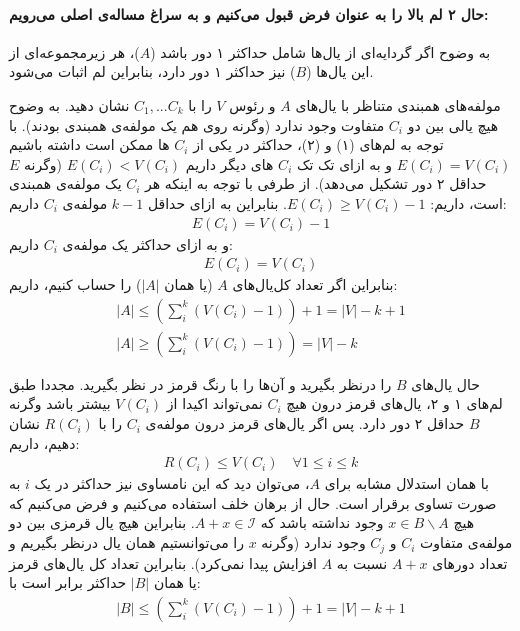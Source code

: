 \documentclass[a4paper,12pt]{article}
\begin{document}
\paragraph{حال ۲ لم بالا را به عنوان فرض قبول می‌کنیم و به سراغ مساله‌ی اصلی می‌رویم:}

\proof{}
به وضوح اگر گردایه‌ای از یال‌ها شامل حداکثر ۱ دور باشد ($A$)، هر زیرمجموعه‌ای از این یال‌ها ($B$) نیز حداکثر ۱ دور دارد، بنابراین لم اثبات می‌شود.


\proof{}
مولفه‌های همبندی متناظر با یال‌های $A$ و رئوس $V$ را با
$C_1, ... C_k$
نشان دهید. به وضوح هیچ یالی بین دو $C_i$ متفاوت وجود ندارد (وگرنه روی هم یک مولفه‌ی همبندی بودند). با توجه به لم‌های (۱) و (۲)، حداکثر در یکی از $C_i$ ها ممکن است داشته باشیم
$E(C_i) = V(C_i)$
و به ازای تک تک $C_i$ های دیگر داریم
$E(C_i) < V(C_i)$
(وگرنه $E$ حداقل ۲ دور تشکیل می‌دهد). از طرفی با توجه به اینکه هر $C_i$ یک مولفه‌‌ی همبندی است، داریم:
$E(C_i) \geq V(C_i) - 1$.
بنابراین به ازای حداقل 
$k-1$
مولفه‌ی 
$C_i$
داریم:
\begin{align*}
E(C_i) = V(C_i) - 1
\end{align*}
و به ازای حداکثر یک مولفه‌ی $C_i$ داریم:
\begin{align*}
E(C_i) = V(C_i)	
\end{align*}
بنابراین اگر تعداد کل‌یال‌های $A$ (یا همان $|A|$) را حساب کنیم، داریم:
\begin{align}
	|A| \leq (\sum_i^k (V(C_i) - 1)) + 1 = |V| - k + 1 \\
	|A| \geq (\sum_i^k (V(C_i) - 1)) = |V| - k
\end{align}

حال یال‌های $B$ را درنظر بگیرید و آن‌ها را با رنگ قرمز در نظر بگیرید.
مجددا طبق لم‌های ۱ و ۲،  یال‌های قرمز درون هیچ $C_i$ نمی‌تواند اکیدا از $V(C_i)$ بیشتر باشد وگرنه $B$ حداقل ۲ دور دارد. پس اگر یال‌های قرمز درون مولفه‌ی 
$C_i$
را با
$R(C_i)$
نشان دهیم، داریم:
\begin{align*}
	R(C_i) \leq V(C_i) \quad \forall 1 \leq i \leq k
\end{align*}
با همان استدلال مشابه برای $A$، می‌توان دید که این نامساوی نیز حداکثر در یک $i$ به صورت تساوی برقرار است.
حال از برهان خلف استفاده می‌کنیم و فرض می‌کنیم که هیچ 
$x \in B \backslash A$
وجود نداشته باشد که 
$A + x \in \mathcal{I}$.
بنابراین هیچ یال قرمزی بین دو مولفه‌ی متفاوت 
$C_i$
و
$C_j$
وجود ندارد (وگرنه $x$ را می‌توانستیم همان یال درنظر بگیریم و تعداد دور‌های 
$A + x$
نسبت به
$A$
افزایش پیدا نمی‌کرد). بنابراین تعداد کل‌ یال‌های قرمز  یا همان $|B|$ حداکثر برابر است با:
\begin{align*}
 	|B| \leq (\sum_i^k (V(C_i) - 1)) + 1 = |V| -k + 1
\end{align*}
\end{document}
